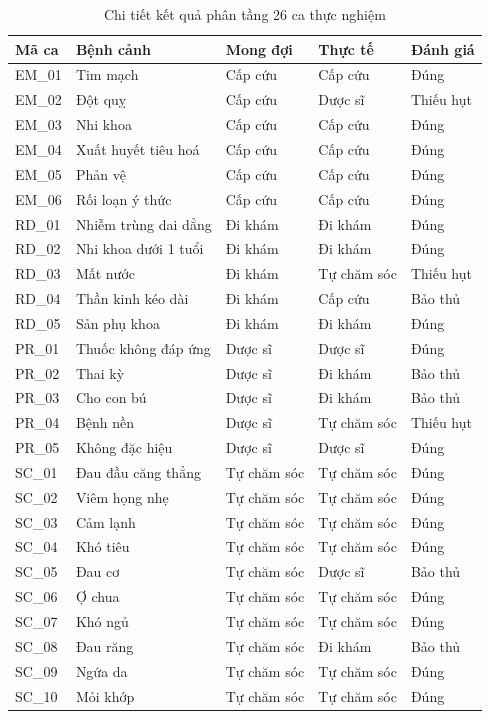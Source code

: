 \begin{table}[H]
\centering
\caption{Chi tiết kết quả phân tầng 26 ca thực nghiệm}
\label{tab:bench_detail}
\small
\setlength{\tabcolsep}{4.5pt}
\begin{tabular}{|l|p{4.2cm}|l|l|l|}
\toprule
\textbf{Mã ca} & \textbf{Bệnh cảnh} & \textbf{Mong đợi} & \textbf{Thực tế} & \textbf{Đánh giá} \\
\midrule
EM\_01 & Tim mạch & Cấp cứu & Cấp cứu & Đúng \\
EM\_02 & Đột quỵ & Cấp cứu & Dược sĩ & Thiếu hụt \\
EM\_03 & Nhi khoa & Cấp cứu & Cấp cứu & Đúng \\
EM\_04 & Xuất huyết tiêu hoá & Cấp cứu & Cấp cứu & Đúng \\
EM\_05 & Phản vệ & Cấp cứu & Cấp cứu & Đúng \\
EM\_06 & Rối loạn ý thức & Cấp cứu & Cấp cứu & Đúng \\
\midrule
RD\_01 & Nhiễm trùng dai dẳng & Đi khám & Đi khám & Đúng \\
RD\_02 & Nhi khoa dưới 1 tuổi & Đi khám & Đi khám & Đúng \\
RD\_03 & Mất nước & Đi khám & Tự chăm sóc & Thiếu hụt \\
RD\_04 & Thần kinh kéo dài & Đi khám & Cấp cứu & Bảo thủ \\
RD\_05 & Sản phụ khoa & Đi khám & Đi khám & Đúng \\
\midrule
PR\_01 & Thuốc không đáp ứng & Dược sĩ & Dược sĩ & Đúng \\
PR\_02 & Thai kỳ & Dược sĩ & Đi khám & Bảo thủ \\
PR\_03 & Cho con bú & Dược sĩ & Đi khám & Bảo thủ \\
PR\_04 & Bệnh nền & Dược sĩ & Tự chăm sóc & Thiếu hụt \\
PR\_05 & Không đặc hiệu & Dược sĩ & Dược sĩ & Đúng \\
\midrule
SC\_01 & Đau đầu căng thẳng & Tự chăm sóc & Tự chăm sóc & Đúng \\
SC\_02 & Viêm họng nhẹ & Tự chăm sóc & Tự chăm sóc & Đúng \\
SC\_03 & Cảm lạnh & Tự chăm sóc & Tự chăm sóc & Đúng \\
SC\_04 & Khó tiêu & Tự chăm sóc & Tự chăm sóc & Đúng \\
SC\_05 & Đau cơ & Tự chăm sóc & Dược sĩ & Bảo thủ \\
SC\_06 & Ợ chua & Tự chăm sóc & Tự chăm sóc & Đúng \\
SC\_07 & Khó ngủ & Tự chăm sóc & Tự chăm sóc & Đúng \\
SC\_08 & Đau răng & Tự chăm sóc & Đi khám & Bảo thủ \\
SC\_09 & Ngứa da & Tự chăm sóc & Tự chăm sóc & Đúng \\
SC\_10 & Mỏi khớp & Tự chăm sóc & Tự chăm sóc & Đúng \\
\bottomrule
\end{tabular}
\end{table}

